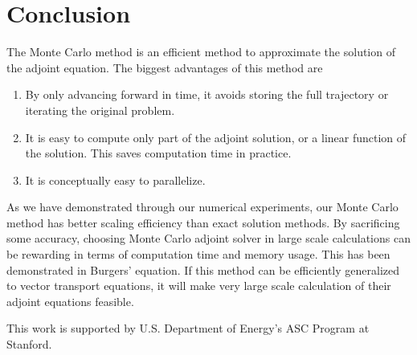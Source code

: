 \documentclass[a4paper,11pt]{article}
\theoremstyle{remark}
\theoremstyle{definition}
\begin{document}
\section{Conclusion}
    The Monte Carlo method is an efficient method to approximate the solution
    of the adjoint equation. The biggest advantages of this method are
    \begin{enumerate}
        \item By only advancing forward in time, it avoids storing the full
              trajectory or iterating the original problem.
        \item It is easy to compute only part of the adjoint solution, or a
              linear function of the solution. This saves computation time
              in practice.
        \item It is conceptually easy to parallelize.
    \end{enumerate}
    As we have demonstrated through our numerical experiments, our Monte
    Carlo method has better scaling efficiency than exact solution methods.
    By sacrificing some accuracy, choosing Monte Carlo adjoint solver in
    large scale calculations can be rewarding in terms of computation time
    and memory usage.  This has been demonstrated in Burgers' equation.
    If this method can be efficiently generalized to vector transport
    equations, it will make very large scale calculation of their adjoint
    equations feasible.



    \vspace{8mm}
    \noindent This work is supported by U.S. Department of Energy's ASC
              Program at Stanford.




\end{document}
